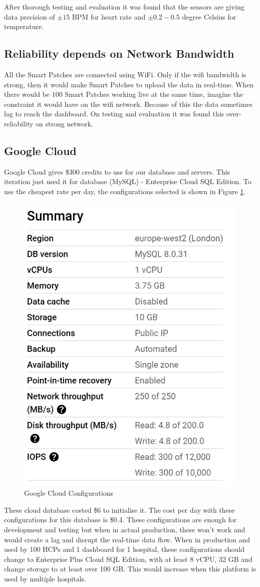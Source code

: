 After thorough testing and evaluation it was found that the sensors are giving data precision of \(± 15\) BPM for heart rate and \(± 0.2-0.5\) degree Celsius for temperature.

\subsection{Reliability depends on Network Bandwidth}
All the Smart Patches are connected using WiFi. Only if the wifi bandwidth is strong, then it would make Smart Patches to upload the data in real-time. When there would be 100 Smart Patches working live at the same time, imagine the constraint it would have on the wifi network. Because of this the data sometimes lag to reach the dashboard. On testing and evaluation it was found this over-reliability on strong network.

\subsection{Google Cloud}
Google Cloud gives \$300 credits to use for our database and servers. This iteration just used it for database (MySQL) - Enterprise Cloud SQL Edition. To use the cheapest rate per day, the configurations selected is shown in Figure \ref{fig:cloud-configurations}.

\begin{figure}[h!]
    \centering
    \includegraphics[width=0.5\linewidth]{images/cloud-configurations.png}
    \caption{Google Cloud Configurations}
    \label{fig:cloud-configurations}
\end{figure}

These cloud database costed \$6 to initialise it. The cost per day with these configurations for this database is \$0.4. These configurations are enough for development and testing but when in actual production, these won't work and would create a lag and disrupt the real-time data flow. When in production and used by 100 HCPs and 1 dashboard for 1 hospital, these configurations should change to Enterprise Plus Cloud SQL Edition, with at least 8 vCPU, 32 GB and change storage to at least over 100 GB. This would increase when this platform is used by multiple hospitals. 


